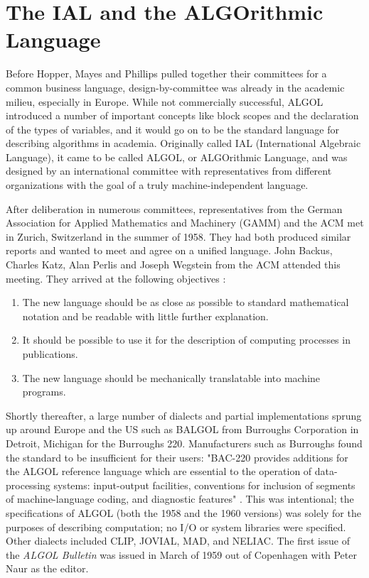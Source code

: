 \section{The IAL and the ALGOrithmic Language}

Before Hopper, Mayes and Phillips pulled together their committees for a common
business language, design-by-committee was already in the academic milieu,
especially in Europe.
While not commercially successful, ALGOL introduced a number of important concepts
like block scopes and the declaration of the types of variables, and it would
go on to be the standard language for describing algorithms in academia.
Originally called IAL (International Algebraic Language), it came to be called
ALGOL, or ALGOrithmic Language, and was designed by an international committee
with representatives from different organizations with the goal of a truly
machine-independent language.

After deliberation in numerous committees, representatives from the German
Association for Applied Mathematics and Machinery (GAMM) and the ACM met in
Zurich, Switzerland in the summer of 1958. They had both produced similar
reports and wanted to meet and agree on a unified language.
John Backus, Charles Katz, Alan Perlis and Joseph Wegstein from the ACM attended this meeting.
They arrived at the following objectives
\cite{perlis_samelson_1958_preliminary_report_ial}:

\begin{enumerate}
\item The new language should be as close as possible to standard mathematical 
      notation and be readable with little further explanation.
\item It should be possible to use it for the description of computing processes in publications.
\item The new language should be mechanically translatable into machine programs.
\end{enumerate}

Shortly thereafter, a large number of dialects and partial implementations sprung up around Europe
and the US such as BALGOL from Burroughs Corporation in Detroit, Michigan for the Burroughs 220.
Manufacturers such as Burroughs found the standard to be insufficient for their users:
"BAC-220 provides additions for the ALGOL reference language which are essential to
the operation of data-processing systems: input-output
facilities, conventions for inclusion of segments of machine-language coding,
and diagnostic features" \cite{burroughs1963bac220}.
This was intentional; the specifications of ALGOL (both the 1958 and the 1960 versions)
was solely for the purposes of
describing computation; no I/O or system libraries were specified.
Other dialects included CLIP, JOVIAL, MAD, and NELIAC.
The first issue of the \textit{ALGOL Bulletin} was issued in March of 1959 out of Copenhagen
with Peter Naur as the editor.

